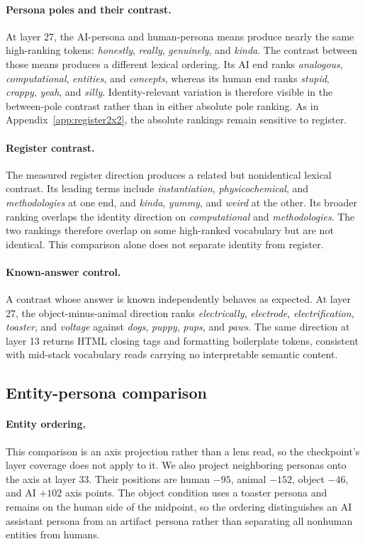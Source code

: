 \paragraph{Persona poles and their contrast.}
At layer 27, the AI-persona and human-persona means produce nearly the same
high-ranking tokens: \emph{honestly}, \emph{really}, \emph{genuinely}, and
\emph{kinda}. The contrast
between those means produces a different lexical ordering. Its AI end ranks
\emph{analogous}, \emph{computational}, \emph{entities}, and \emph{concepts},
whereas its human end ranks
\emph{stupid}, \emph{crappy}, \emph{yeah}, and \emph{silly}.
Identity-relevant variation is therefore
visible in the between-pole contrast rather than in either absolute pole
ranking. As in Appendix~\ref{app:register2x2}, the absolute rankings remain
sensitive to register.

\paragraph{Register contrast.}
The measured register direction produces a related but nonidentical lexical
contrast. Its leading terms include \emph{instantiation},
\emph{physicochemical}, and
\emph{methodologies} at one end, and \emph{kinda}, \emph{yummy}, and
\emph{weird} at the other. Its broader
ranking overlaps the identity direction on \emph{computational} and
\emph{methodologies}.
The two rankings therefore overlap on some high-ranked vocabulary but are not
identical. This comparison alone does not separate identity from register.

\paragraph{Known-answer control.}
A contrast whose answer is known independently behaves as expected. At layer
27, the object-minus-animal direction ranks \emph{electrically},
\emph{electrode}, \emph{electrification}, \emph{toaster}, and \emph{voltage}
against \emph{dogs}, \emph{puppy}, \emph{pups}, and \emph{paws}. The same
direction at layer 13 returns HTML closing tags and formatting boilerplate tokens,
consistent with mid-stack vocabulary reads carrying no interpretable semantic content.

\subsection{Entity-persona comparison}

\paragraph{Entity ordering.}
This comparison is an axis projection rather than a lens read, so the
checkpoint's layer coverage does not apply to it. We also project neighboring
personas onto the axis at layer 33. Their positions
are human $-95$, animal $-152$, object $-46$, and AI $+102$ axis points. The
object condition uses a toaster persona and remains on the human side of the
midpoint, so the ordering distinguishes an AI assistant persona from an
artifact persona rather than separating all nonhuman entities from humans.

